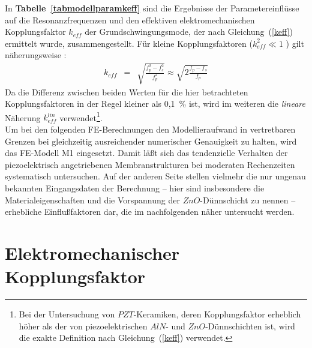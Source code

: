 In {\bf Tabelle~\ref{tabmodellparamkeff}} sind die Ergebnisse der
Parametereinflüsse auf die Resonanzfrequenzen und den effektiven
elektromechanischen Kopplungsfaktor $k_{eff}$ der Grundschwingungsmode, der
nach Gleichung~(\ref{keff}) ermittelt wurde, zusammengestellt. Für kleine
Kopplungsfaktoren ($k_{eff}^{2} \ll 1$ ) gilt näherungsweise \cite{Sie81}:
%
\begin{eqnarray}
\label{keffnaeherung}
 k_{eff} & = & \sqrt{ \frac{f_{p}^{2} - f_{s}^{2}}{f_{p}^{2}}}
            \approx \sqrt{ 2 \frac{f_{p} - f_{s}}{f_{p}}}
\end{eqnarray}
%
Da die Differenz zwischen beiden Werten für die hier betrachteten
Kopplungsfaktoren in der Regel kleiner als 0,1~\% ist, wird im weiteren
die {\em lineare} Näherung $k^{lin}_{eff}$ verwendet\footnote{Bei
der Untersuchung von $PZT$-Keramiken, deren Kopplungsfaktor erheblich höher
als der von piezoelektrischen $AlN$- und $ZnO$-Dünnschichten ist, wird die
exakte Definition nach Gleichung~(\ref{keff}) verwendet.}.\\
Um bei den folgenden FE-Berechnungen den Modellieraufwand in vertretbaren
Grenzen bei gleichzeitig ausreichender numerischer Genauigkeit zu halten,
wird das FE-Modell M1 eingesetzt. Damit läßt sich das tendenzielle Verhalten
der piezoelektrisch angetriebenen Membranstrukturen bei moderaten
Rechenzeiten systematisch untersuchen. Auf der anderen Seite stellen
vielmehr die nur ungenau bekannten Eingangsdaten der Berechnung --
hier sind insbesondere die Materialeigenschaften und die Vorspannung der
$ZnO$-Dünnschicht zu nennen -- erhebliche Einflußfaktoren dar, die im
nachfolgenden näher untersucht werden.



\section{Elektromechanischer Kopplungsfaktor}
\label{elektromech}


